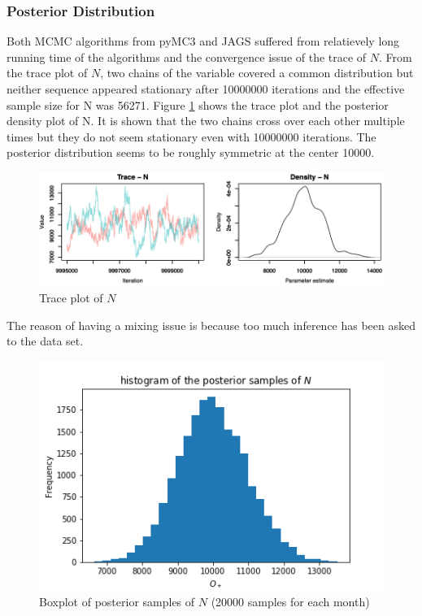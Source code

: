 \documentclass[12pt]{article}
\begin{document}
{\subsubsection{Posterior Distribution}
Both MCMC algorithms from pyMC3 and JAGS suffered from relatievely long running time of the algorithms and the convergence issue of the trace of $N$. From the trace plot of $N$, two chains of the variable covered a common distribution but neither sequence appeared stationary after 10000000 iterations and the effective sample size for N was 56271. Figure \ref{trace_N} shows the trace plot and the posterior density plot of N. It is shown that the two chains cross over each other multiple times but they do not seem stationary even with 10000000 iterations. The posterior distribution seems to be roughly symmetric at the center 10000. 
\begin{figure}[h]
	\centering
	\includegraphics[width=1\linewidth]{Figures/not_mixed_N.png}
	\caption{Trace plot of $N$}
	\label{trace_N}
\end{figure}

The reason of having a mixing issue is because too much inference has been asked to the data set. ~

\begin{figure}[h]
	\centering
	\includegraphics[width=1\linewidth]{Figures/hist_N.png}
	\caption{Boxplot of posterior samples of $N$ (20000 samples for each month)}
	\label{hist_unk_n}
\end{figure}

}
\end{document}
